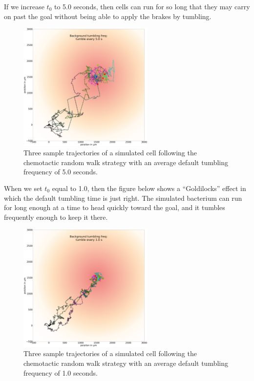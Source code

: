 If we increase $t_0$ to 5.0 seconds, then cells can run for so long that they may carry on past the goal without being able to apply the brakes by tumbling.

\begin{figure}[h]
\centering
\mySfFamily
\includegraphics[width = 0.6\textwidth]{../images/chemotaxis_traj_5.0_uniform.png}
\caption{Three sample trajectories of a simulated cell following the chemotactic random walk strategy with an average default tumbling frequency of 5.0 seconds.}
\label{fig:chemotaxis_traj_5.0_uniform}
\end{figure}


When we set $t_0$ equal to 1.0, then the figure below shows a ``Goldilocks'' effect in which the default tumbling time is just right. The simulated bacterium can run for long enough at a time to head quickly toward the goal, and it tumbles frequently enough to keep it there.

\begin{figure}[h]
\centering
\mySfFamily
\includegraphics[width = 0.6\textwidth]{../images/chemotaxis_traj_1.0_uniform.png}
\caption{Three sample trajectories of a simulated cell following the chemotactic random walk strategy with an average default tumbling frequency of 1.0 seconds.}
\label{fig:chemotaxis_traj_1.0_uniform}
\end{figure}


